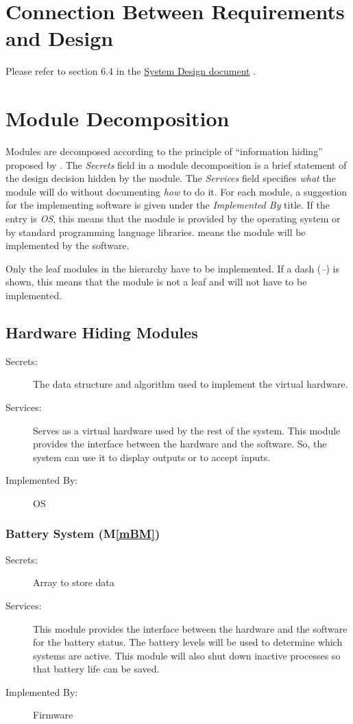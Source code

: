 \documentclass[12pt, titlepage]{article}
\newcommand{\mref}[1]{M\ref{#1}}
\begin{document}
\section{Connection Between Requirements and Design} \label{SecConnection}

Please refer to section 6.4 in the \href{https://github.com/zakerl/Capstone_Project/blob/main/docs/Design/SystDesign/SystDes.pdf}{System Design document} .

\section{Module Decomposition} \label{SecMD}

Modules are decomposed according to the principle of ``information hiding''
proposed by \citet{ParnasEtAl1984}. The \emph{Secrets} field in a module
decomposition is a brief statement of the design decision hidden by the
module. The \emph{Services} field specifies \emph{what} the module will do
without documenting \emph{how} to do it. For each module, a suggestion for the
implementing software is given under the \emph{Implemented By} title. If the
entry is \emph{OS}, this means that the module is provided by the operating
system or by standard programming language libraries.  \emph{\progname{}} means the
module will be implemented by the \progname{} software.

Only the leaf modules in the hierarchy have to be implemented. If a dash
(\emph{--}) is shown, this means that the module is not a leaf and will not have
to be implemented.

\subsection{Hardware Hiding Modules}

\begin{description}
  \item[Secrets:]The data structure and algorithm used to implement the virtual
  hardware.
  \item[Services:]Serves as a virtual hardware used by the rest of the
  system. This module provides the interface between the hardware and the
  software. So, the system can use it to display outputs or to accept inputs.
  \item[Implemented By:] OS
\end{description}

\subsubsection{Battery System (\mref{mBM})}
\begin{description}
  \item[Secrets:] Array to store data
  \item[Services:] This module provides the interface between the hardware and the
    software for the battery status. The battery levels will be used to determine which systems are active. This module will also shut down inactive processes so that battery life can be saved.
  \item[Implemented By:] Firmware
\end{description}
\end{document}
